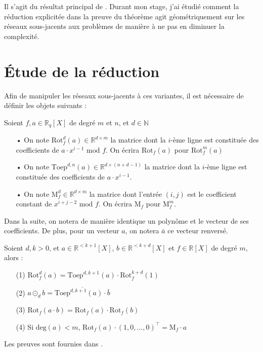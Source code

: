 \documentclass[11pt,a4paper]{article}
\begin{document}
Il s'agit du résultat principal de \cite{mplwe}. Durant mon stage, j'ai étudié comment la réduction explicitée dans la preuve du théorème agit géométriquement sur les réseaux sous-jacents aux problèmes de manière à ne pas en diminuer 	la complexité.

\section{Étude de la réduction}

Afin de manipuler les réseaux sous-jacents à ces variantes, il est nécessaire de définir les objets suivants : 

\begin{defin} Soient $f,a\in \mathbb{R}_q[X]$ de degré $m$ et $n$, et $d \in \mathbb{N}$
\begin{enumerate}
\item[•] On note $\text{Rot}^d_f(a) \in \mathbb{R}^{d\times m}$ la matrice dont la $i$-ème ligne est constituée des coefficients de $a\cdot x^{i-1}\text{ mod } f$. On écrira $\text{Rot}_f(a)$ pour  $\text{Rot}^m_f(a)$
\item[•] On note $\text{Toep}^{d,n}(a) \in \mathbb{R}^{d\times(n+d-1)}$ la matrice dont la $i$-ème ligne est constituée des coefficients de $a\cdot x^{i-1}$.
\item[•] On note $\text{M}_f^d \in \mathbb{R}^{d\times m}$ la matrice dont l'entrée $(i,j)$ est le coefficient constant de $x^{i+j-2}\text{ mod }f$. On écrira $\text{M}_f$ pour  $\text{M}_f^m$.
\end{enumerate}
\end{defin}


Dans la suite, on notera de manière identique un polynôme et le vecteur de ses coefficients. De plus, pour un vecteur $a$, on notera $\bar a$ ce vecteur renversé. \\
\begin{lemma} Soient $d,k >0$, et $a \in \mathbb{R}^{<k+1}[X]$, $b \in \mathbb{R}^{<k+d}[X]$ et $f \in \mathbb{R}[X]$ de degré $m$, alors :
\begin{enumerate}
\item[(1)]$\text{Rot}^d_f(a) = \text{Toep}^{d,k+1}(a)\cdot\text{Rot}^{k+d}_f(1)$
\item[(2)] $a\odot_d b = \overline{\text{Toep}^{d,k+1}(a)\cdot \bar{b}}$
\item[(3)] $\text{Rot}_f(a\cdot b)=\text{Rot}_f(a)\cdot\text{Rot}_f(b)$
\item[(4)] Si $\text{deg}(a) < m$, $\text{Rot}_f(a)\cdot(1,0,\dots,0)^\top = \text{M}_f\cdot a$
\end{enumerate}
\end{lemma}
Les preuves sont fournies dans \cite{mplwe}.
\end{document}
